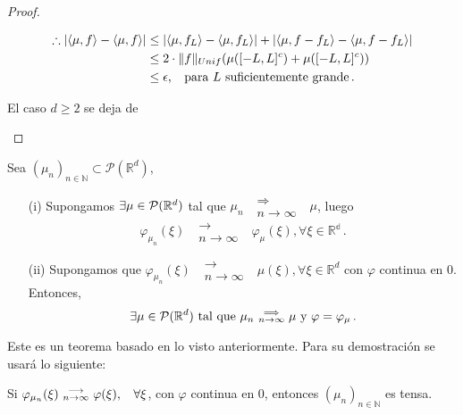 \begin{proof}
\begin{itemize}
\begin{itemize}
        \begin{alignat*}{2}
        \therefore |\langle \mu,f\rangle-\langle\mu,f\rangle| & \leq |\langle \mu,f_L\rangle-\langle\mu,f_L\rangle| + |\langle \mu,f-f_L\rangle-\langle\mu,f-f_L\rangle| \\
         & \leq 2\cdot \|f\|_{Unif}(\mu([-L,L]^c)+\mu([-L,L]^c)) \\
         & \leq \epsilon , \hspace{.25cm}\, \mbox{para }L\mbox{ suficientemente grande} \, .
        \end{alignat*}
    \end{itemize}
    El caso $d\geq 2$ se deja de \ejercicio
\end{itemize}
\findem
\negro
\end{proof}

\begin{theorem}[Lévy]
\label{theorem:levy}
Sea $(\mu_n)_{n\in\mathbb{N}}\subset\mathcal{P}(\mathbb{R}^d)$,
\begin{enumerate}
    \item[(i)] Supongamos $\exists \mu\in\mathcal{P}(\mathbb{R}^d)$ tal que $\mu_n\mbox{ }\substack{\Longrightarrow \\ n\to\infty}\mbox{ }\mu$, luego 
    $$ \varphi_{\mu_n}(\xi)\mbox{ }\substack{\longrightarrow \\ n\to\infty}\mbox{ }\varphi_\mu(\xi), \forall\xi\in\mathbb{R^d} \, .$$
    \item[(ii)] Supongamos que $\varphi_{\mu_n}(\xi)\mbox{ }\substack{\longrightarrow \\ n\to\infty}\mbox{ }\mu(\xi), \forall\xi\in\mathbb{R}^d$ con $\varphi$ continua en $0$. Entonces, $$\exists\mu\in\mathcal{P}(\mathbb{R}^d)\mbox{ tal que }\mu_n\mbox{ }\substack{\Longrightarrow \\ n\to\infty}\mbox{ }\mu\mbox{ y }\varphi=\varphi_\mu \, .$$
\end{enumerate}
\end{theorem}
Este es un teorema basado en lo visto anteriormente. Para su demostración se usará lo siguiente:
\begin{lemma}
\label{lemma:levy}
Si $\varphi_{\mu_n}(\xi)\mbox{ }\substack{\longrightarrow \\ n\to\infty}\mbox{ }\varphi(\xi), \hspace{.25cm}\, \forall \xi$, con $\varphi$ continua en $0$, entonces $(\mu_n)_{n\in\mathbb{N}}$ es tensa.
\end{lemma}
